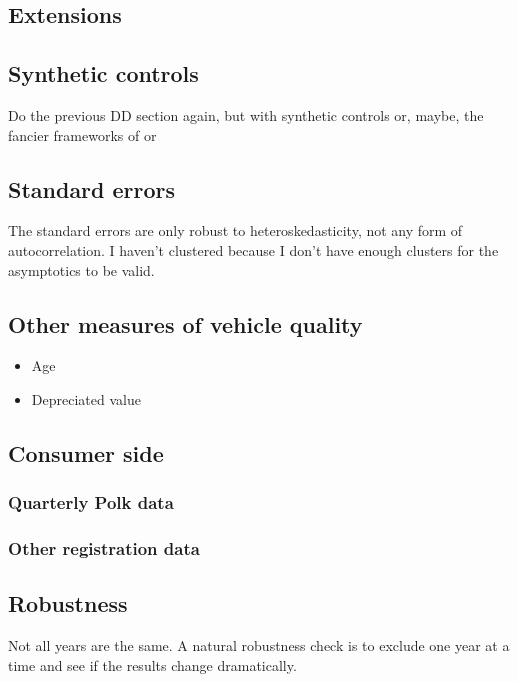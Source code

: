 \documentclass[11pt,letterpaper,oneside]{article}
\begin{document}
\begin{doublespacing}
\section{Extensions}

\subsection{Synthetic controls}
\label{sec:synthetic-controls}
Do the previous DD section again, but with synthetic controls or, maybe, the fancier frameworks of
\textcite{DoudchenkoImbens2016DD} or \textcite{Xu2016}

\subsection{Standard errors}
The standard errors are only robust to heteroskedasticity, not any form of autocorrelation.
I haven't clustered because I don't have enough clusters for the asymptotics to be valid.

\subsection{Other measures of vehicle quality}
\begin{itemize}
    \item Age
    \item Depreciated value
\end{itemize}

\subsection{Consumer side}
\subsubsection{Quarterly Polk data}
\subsubsection{Other registration data}

\subsection{Robustness}
Not all years are the same.
A natural robustness check is to exclude one year at a time and see if the results change dramatically.





\end{doublespacing}
\end{document}
